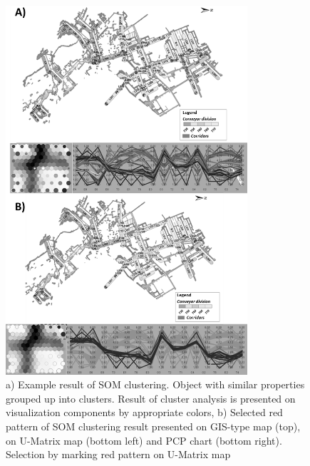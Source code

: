 \begin{figure}[ht!]
\centering
\includegraphics[width =0.8\textwidth]{Wykresy/Fig_6.png}
\caption{a) Example result of SOM clustering. Object with similar properties grouped up into clusters. Result of cluster analysis is presented on visualization components by appropriate colors, b) Selected red pattern of SOM clustering result presented on GIS-type map (top), on U-Matrix map (bottom left) and PCP chart (bottom right). Selection by marking red pattern on  U-Matrix map}
\label{fig: f6}
\end{figure}


